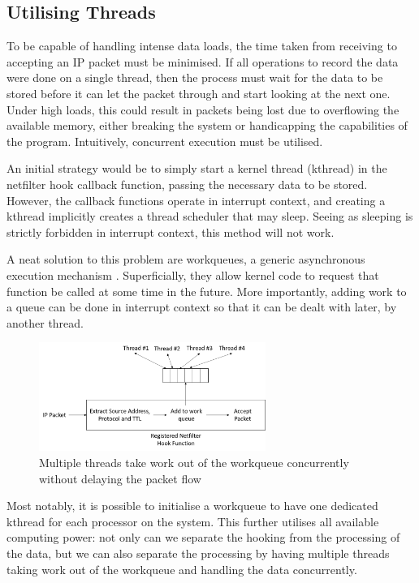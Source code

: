 \documentclass[12pt,twoside]{article}
\begin{document}
\subsection{Utilising Threads}
To be capable of handling intense data loads, the time taken from receiving to accepting an IP packet must be minimised. If all operations to record the data were done on a single thread, then the process must wait for the data to be stored before it can let the packet through and start looking at the next one. Under high loads, this could result in packets being lost due to overflowing the available memory, either breaking the system or handicapping the capabilities of the program. Intuitively, concurrent execution must be utilised.

An initial strategy would be to simply start a kernel thread (kthread) in the netfilter hook callback function, passing the necessary data to be stored. However, the callback functions operate in interrupt context, and creating a kthread implicitly creates a thread scheduler that may sleep. Seeing as sleeping is strictly forbidden in interrupt context, this method will not work.

A neat solution to this problem are workqueues, a generic asynchronous execution mechanism \cite{workqueue}. Superficially, they allow kernel code to request that function be called at some time in the future. More importantly, adding work to a queue can be done in interrupt context so that it can be dealt with later, by another thread.

\begin{figure}[h]
	\begin{center}
		\includegraphics[width=7.37cm, height=3.55cm]{figures/workqueue}
	\end{center}
	\caption{Multiple threads take work out of the workqueue concurrently without delaying the packet flow}
	\label{figure_workqueue} 
\end{figure}

Most notably, it is possible to initialise a workqueue to have one dedicated kthread for each processor on the system. This further utilises all available computing power: not only can we separate the hooking from the processing of the data, but we can also separate the processing by having multiple threads taking work out of the workqueue and handling the data concurrently.
\end{document}
